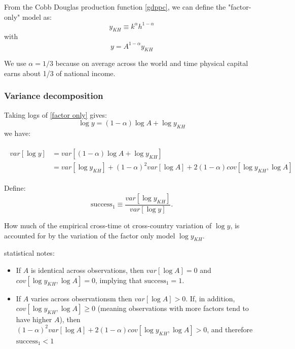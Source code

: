 \documentclass[11pt]{article}
\begin{document}
From the Cobb Douglas production function \eqref{gdppc}, we can define the "factor-only" model as:
\[y_{KH} \equiv k^\alpha h^{1-\alpha}\]
with
\begin{equation}
\label{factor only}
    y = A^{1-\alpha} y_{KH}
\end{equation}


We use $\alpha= 1/3$ because on average across the world and time physical capital earns about 1/3 of national income.
\subsubsection{Variance decomposition}
Taking logs of \eqref{factor only} gives:
\[\log y = (1-\alpha) \log A + \log y_{KH}\]
we have:
   
    \begin{align}
     \label{variance decomp}
    \begin{split}
        var\left[\log y\right] &= var\left[(1-\alpha) \log A + \log y_{KH}\right] \\
        &= var\left[ \log y_{KH} \right] + (1-\alpha)^2 var\left[ \log A\right] + 2(1-\alpha) cov\left[ \log y_{KH}, \log A \right]
    \end{split}
    \end{align}

    \begin{shaded}
        Define:
        \begin{equation}
        \label{success1}
            \text{success}_1 \equiv \dfrac{var\left[ \log y_{KH}\right]}{var\left[ \log y \right]}.
        \end{equation}
        

        How much of the empirical cross-time ot cross-country variation of $\log y$, is accounted for by the variation of the factor only model $\log y_{KH}$.
    \end{shaded}
        \begin{note}
        statistical notes:
        \begin{itemize}
            \item If $A$ is identical across observations, then $var\left[\log A\right] = 0$ and $cov\left[ \log y_{KH}, \log A \right]= 0$, implying that $\text{success}_1 = 1$.
            \item If $A$ varies across observationsm then $var \left[ \log A \right] >0$. If, in addition, $cov\left[ \log y_{KH}, \log A \right] \geq 0$ (meaning observations with more factors tend to have higher $A$), then $(1-\alpha)^2 var\left[ \log A\right] + 2(1-\alpha) cov\left[ \log y_{KH}, \log A \right]>0$, and therefore $\text{success}_1<1$
        \end{itemize}
        \end{note}
\end{document}
